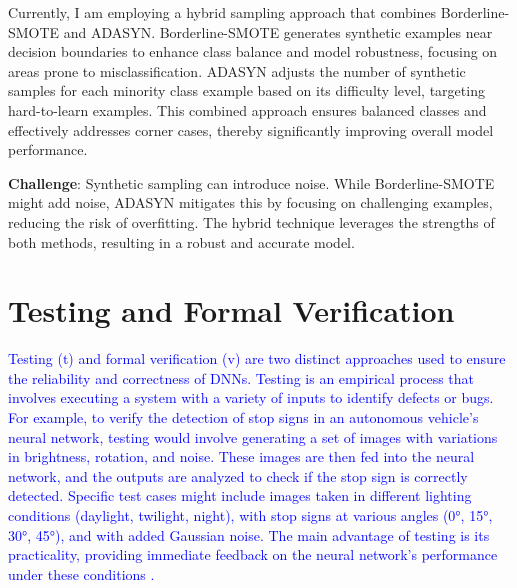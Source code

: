 \begin{tcolorbox}[colback=purple!2!white, colframe=purple]

  Currently, I am employing a hybrid sampling approach that combines Borderline-SMOTE and ADASYN. Borderline-SMOTE generates synthetic examples near decision boundaries to enhance class balance and model robustness, focusing on areas prone to misclassification. ADASYN adjusts the number of synthetic samples for each minority class example based on its difficulty level, targeting hard-to-learn examples. This combined approach ensures balanced classes and effectively addresses corner cases, thereby significantly improving overall model performance.
  
  \textbf{Challenge}: Synthetic sampling can introduce noise. While Borderline-SMOTE might add noise, ADASYN mitigates this by focusing on challenging examples, reducing the risk of overfitting. The hybrid technique leverages the strengths of both methods, resulting in a robust and accurate model.
  
  \end{tcolorbox}


\section{Testing and Formal Verification}
\textcolor{blue}{
Testing (t) and formal verification (v) are two distinct approaches used to ensure the reliability and correctness of DNNs. Testing is an empirical process that involves executing a system with a variety of inputs to identify defects or bugs. For example, to verify the detection of stop signs in an autonomous vehicle's neural network, testing would involve generating a set of images with variations in brightness, rotation, and noise. These images are then fed into the neural network, and the outputs are analyzed to check if the stop sign is correctly detected. Specific test cases might include images taken in different lighting conditions (daylight, twilight, night), with stop signs at various angles (0°, 15°, 30°, 45°), and with added Gaussian noise. The main advantage of testing is its practicality, providing immediate feedback on the neural network’s performance under these conditions \cite{Albarghouthi}.}

